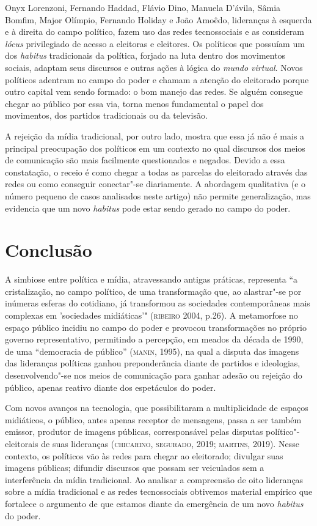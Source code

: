 Onyx Lorenzoni, Fernando Haddad, Flávio Dino, Manuela D'ávila, Sâmia
Bomfim, Major Olímpio, Fernando Holiday e João Amoêdo, lideranças à
esquerda e à direita do campo político, fazem uso das redes
tecnossociais e as consideram \textit{lócus} privilegiado de acesso a
eleitoras e eleitores. Os políticos que possuíam um dos \textit{habitus}
tradicionais da política, forjado na luta dentro dos movimentos sociais,
adaptam seus discursos e outras ações à lógica do \textit{mundo virtual}.
Novos políticos adentram no campo do poder e chamam a atenção do
eleitorado porque outro capital vem sendo formado: o bom manejo das
redes. Se alguém consegue chegar ao público por essa via, torna menos
fundamental o papel dos movimentos, dos partidos tradicionais ou da
televisão.

A rejeição da mídia tradicional, por outro lado, mostra que essa já não
é mais a principal preocupação dos políticos em um contexto no qual
discursos dos meios de comunicação são mais facilmente questionados e
negados. Devido a essa constatação, o receio é como chegar a todas as
parcelas do eleitorado através das redes ou como conseguir conectar"-se
diariamente. A abordagem qualitativa (e o número pequeno de casos
analisados neste artigo) não permite generalização, mas evidencia que um
novo \textit{habitus} pode estar sendo gerado no campo do poder.

\section{Conclusão}

A simbiose entre política e mídia, atravessando antigas práticas,
representa ``a cristalização, no campo político, de uma transformação
que, ao alastrar"-se por inúmeras esferas do cotidiano, já transformou as
sociedades contemporâneas mais complexas em 'sociedades midiáticas'"
(\textsc{ribeiro} 2004, p.26). A metamorfose no espaço público incidiu no campo
do poder e provocou transformações no próprio governo representativo,
permitindo a percepção, em meados da década de 1990, de uma ``democracia
de público'' (\textsc{manin}, 1995), na qual a disputa das imagens das lideranças
políticas ganhou preponderância diante de partidos e ideologias,
desenvolvendo"-se nos meios de comunicação para ganhar adesão ou rejeição
do público, apenas reativo diante dos espetáculos do poder.

Com novos avanços na tecnologia, que possibilitaram a multiplicidade de
espaços midiáticos, o público, antes apenas receptor de mensagens, passa
a ser também emissor, produtor de imagens públicas, corresponsável pelas
disputas político"-eleitorais de suas lideranças (\textsc{chicarino}, \textsc{segurado},
2019; \textsc{martins}, 2019). Nesse contexto, os políticos vão às redes para
chegar ao eleitorado; divulgar suas imagens públicas; difundir discursos
que possam ser veiculados sem a interferência da mídia tradicional. Ao
analisar a compreensão de oito lideranças sobre a mídia tradicional e as
redes tecnossociais obtivemos material empírico que fortalece o
argumento de que estamos diante da emergência de um novo \textit{habitus}
do poder.

